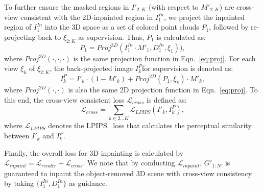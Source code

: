 To further ensure the masked regions in $I'_{2:K}$ (with respect to $M'_{2:K}$) are cross-view consistent with the 2D-inpainted region in $I^{In}_1$, we project the inpainted region of $I^{In}_1$ into the 3D space as a set of colored point clouds $P_1$, followed by re-projecting back to $\xi_{2:K}$ as supervision. Thus, $P_1$ is calculated as:
\begin{equation}
    P_1 =  Proj^{3D}(I^{In}_1 \cdot M'_1, D^{In}_1, \xi_1)),
\end{equation} 
where $Proj^{3D}(\cdot, \cdot, \cdot)$ is the same projection function in Eqn.~\ref{eq:proj}. For each view $\xi_k$  of $\xi_{2:K}$, the back-projected image $I^P_k$for supervision is denoted as:
\begin{equation}
    I^{P}_k =  I'_k \cdot (1-M'_k) + Proj^{2D}(P_1, \xi_k)\cdot M'_k,
\end{equation}
where $Proj^{2D}(\cdot, \cdot)$ is also the same 2D projection function in Eqn.~\ref{eq:proj}. To this end, the cross-view consistent loss $\mathcal{L}_{cross}$ is defined as:
\begin{equation} \label{Lcross}
    \mathcal{L}_{cross} = \sum_{k\in {2...K}} \mathcal{L}_{LPIPS}(I'_k, I^{P}_k),
\end{equation}
where $\mathcal{L}_{LPIPS}$ denotes the LPIPS~\cite{lpips} loss that calculates the perceptual similarity between $I'_k$ and $I^{P}_k$.

Finally, the overall loss for 3D inpainting is calculated by $\mathcal{L}_{inpaint} = \mathcal{L}_{render} + \mathcal{L}_{cross}$. We note that by conducting $\mathcal{L}_{inpaint}$, $G'_{1:N'}$ is guaranteed to inpaint the object-removed 3D scene with cross-view consistency by taking $\{I^{In}_1, D^{In}_1 \}$ as guidance. 

